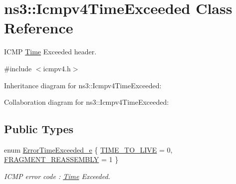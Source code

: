 \hypertarget{classns3_1_1Icmpv4TimeExceeded}{}\section{ns3\+:\+:Icmpv4\+Time\+Exceeded Class Reference}
\label{classns3_1_1Icmpv4TimeExceeded}


I\+C\+MP \hyperlink{classns3_1_1Time}{Time} Exceeded header.  




{\ttfamily \#include $<$icmpv4.\+h$>$}



Inheritance diagram for ns3\+:\+:Icmpv4\+Time\+Exceeded\+:


Collaboration diagram for ns3\+:\+:Icmpv4\+Time\+Exceeded\+:
\subsection*{Public Types}
\begin{DoxyCompactItemize}
\item 
enum \hyperlink{classns3_1_1Icmpv4TimeExceeded_ab4e5abc75de6a8cbd48ee9b1e0dafe81}{Error\+Time\+Exceeded\+\_\+e} \{ \hyperlink{classns3_1_1Icmpv4TimeExceeded_ab4e5abc75de6a8cbd48ee9b1e0dafe81ada70b9e3774b64fd0cf294074d2134f5}{T\+I\+M\+E\+\_\+\+T\+O\+\_\+\+L\+I\+VE} = 0, 
\hyperlink{classns3_1_1Icmpv4TimeExceeded_ab4e5abc75de6a8cbd48ee9b1e0dafe81a6171b1bf16611e163443c561f922eeb3}{F\+R\+A\+G\+M\+E\+N\+T\+\_\+\+R\+E\+A\+S\+S\+E\+M\+B\+LY} = 1
 \}\begin{DoxyCompactList}\small\item\em I\+C\+MP error code \+: \hyperlink{classns3_1_1Time}{Time} Exceeded. \end{DoxyCompactList}
\end{DoxyCompactItemize}
